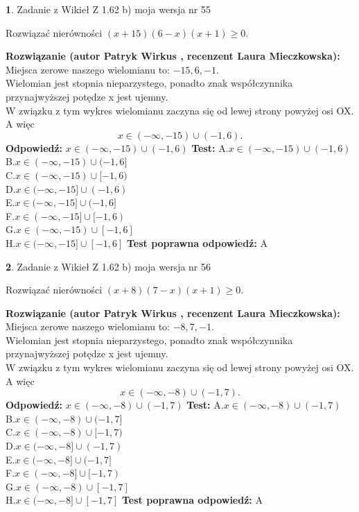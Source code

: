 \documentclass[12pt, a4paper]{article}
\theoremstyle{definition} %
\newtheorem{zad}{}
\newcommand{\zadStart}[1]{\begin{zad}#1\newline}
\newcommand{\zadStop}{\end{zad}}
\newcommand{\rozwStart}[2]{\noindent \textbf{Rozwiązanie (autor #1 , recenzent #2): }\newline}
\newcommand{\rozwStop}{\newline}
\newcommand{\odpStart}{\noindent \textbf{Odpowiedź:}\newline}
\newcommand{\odpStop}{\newline}
\newcommand{\testStart}{\noindent \textbf{Test:}\newline}
\newcommand{\testStop}{\newline}
\newcommand{\kluczStart}{\noindent \textbf{Test poprawna odpowiedź:}\newline}
\newcommand{\kluczStop}{\newline}
\begin{document}
\zadStart{Zadanie z Wikieł Z 1.62 b) moja wersja nr 55}

Rozwiązać nierówności $(x+15)(6-x)(x+1)\ge0$.
\zadStop
\rozwStart{Patryk Wirkus}{Laura Mieczkowska}
Miejsca zerowe naszego wielomianu to: $-15, 6, -1$.\\
Wielomian jest stopnia nieparzystego, ponadto znak współczynnika przy\linebreak najwyższej potędze x jest ujemny.\\ W związku z tym wykres wielomianu zaczyna się od lewej strony powyżej osi OX. A więc $$x \in (-\infty,-15) \cup (-1,6).$$
\rozwStop
\odpStart
$x \in (-\infty,-15) \cup (-1,6)$
\odpStop
\testStart
A.$x \in (-\infty,-15) \cup (-1,6)$\\
B.$x \in (-\infty,-15) \cup (-1,6]$\\
C.$x \in (-\infty,-15) \cup [-1,6)$\\
D.$x \in (-\infty,-15] \cup (-1,6)$\\
E.$x \in (-\infty,-15] \cup (-1,6]$\\
F.$x \in (-\infty,-15] \cup [-1,6)$\\
G.$x \in (-\infty,-15) \cup [-1,6]$\\
H.$x \in (-\infty,-15] \cup [-1,6]$
\testStop
\kluczStart
A
\kluczStop



\zadStart{Zadanie z Wikieł Z 1.62 b) moja wersja nr 56}

Rozwiązać nierówności $(x+8)(7-x)(x+1)\ge0$.
\zadStop
\rozwStart{Patryk Wirkus}{Laura Mieczkowska}
Miejsca zerowe naszego wielomianu to: $-8, 7, -1$.\\
Wielomian jest stopnia nieparzystego, ponadto znak współczynnika przy\linebreak najwyższej potędze x jest ujemny.\\ W związku z tym wykres wielomianu zaczyna się od lewej strony powyżej osi OX. A więc $$x \in (-\infty,-8) \cup (-1,7).$$
\rozwStop
\odpStart
$x \in (-\infty,-8) \cup (-1,7)$
\odpStop
\testStart
A.$x \in (-\infty,-8) \cup (-1,7)$\\
B.$x \in (-\infty,-8) \cup (-1,7]$\\
C.$x \in (-\infty,-8) \cup [-1,7)$\\
D.$x \in (-\infty,-8] \cup (-1,7)$\\
E.$x \in (-\infty,-8] \cup (-1,7]$\\
F.$x \in (-\infty,-8] \cup [-1,7)$\\
G.$x \in (-\infty,-8) \cup [-1,7]$\\
H.$x \in (-\infty,-8] \cup [-1,7]$
\testStop
\kluczStart
A
\kluczStop
\end{document}
